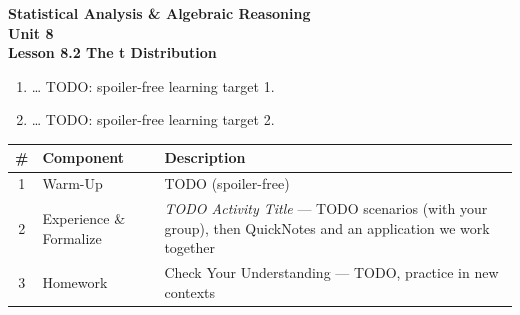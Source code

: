 \documentclass[10pt]{article}
\begin{document}
\vspace{-0.8in}

\begin{center}
  {\color{white}\textbf{\LARGE Statistical Analysis \& Algebraic Reasoning}}\\[4pt]
  {\color{frostmid}\large\textbf{Unit 8}}\\[6pt]
  {\color{white}\textbf{\large Lesson 8.2 \quad The t Distribution}}
\end{center}

\vspace{0.22in}
\namedateperiod
\vspace{0.18in}

\begin{learningtargetbox}
\small
\begin{enumerate}[leftmargin=1.5em, itemsep=5pt]
  \item \ldots{} TODO: spoiler-free learning target 1.
  \item \ldots{} TODO: spoiler-free learning target 2.
\end{enumerate}
\end{learningtargetbox}

\vspace{0.14in}

\begin{tocbox}
\small
\renewcommand{\arraystretch}{1.5}
\begin{tabularx}{\linewidth}{@{} c l X @{}}
\rowcolor{frost}
\textbf{\#} & \textbf{Component} & \textbf{Description} \\
\midrule
1 & Warm-Up    & TODO (spoiler-free) \\
2 & Experience \& Formalize & \emph{TODO Activity Title} --- TODO scenarios (with your group),
                 then QuickNotes and an application we work together \\
3 & Homework   & Check Your Understanding --- TODO, practice in new contexts \\
\end{tabularx}
\end{tocbox}
\end{document}
